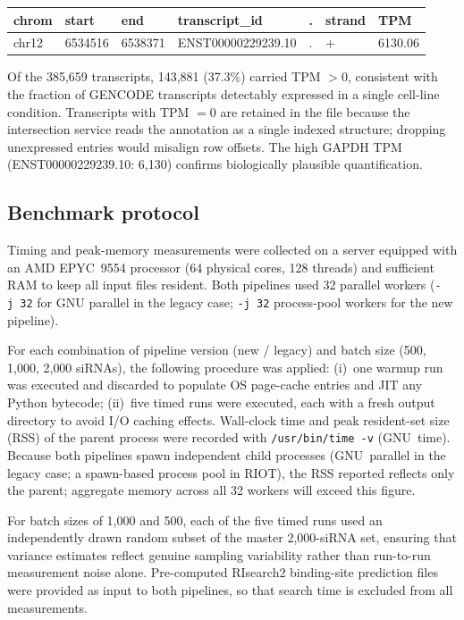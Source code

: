 \begin{center}
\small
\begin{tabular}{lllllll}
\hline
chrom & start & end & transcript\_id & . & strand & TPM \\
\hline
chr12 & 6534516 & 6538371 & ENST00000229239.10 & . & + & 6130.06 \\
\hline
\end{tabular}
\end{center}

Of the 385{,}659 transcripts, 143{,}881 (37.3\%) carried TPM $> 0$, consistent with the fraction of GENCODE transcripts detectably expressed in a single cell-line condition.
Transcripts with TPM $= 0$ are retained in the file because the intersection service reads the annotation as a single indexed structure; dropping unexpressed entries would misalign row offsets.
The high GAPDH TPM (ENST00000229239.10: 6{,}130) confirms biologically plausible quantification.

\subsection*{Benchmark protocol}

Timing and peak-memory measurements were collected on a server equipped with an AMD EPYC~9554 processor (64 physical cores, 128 threads) and sufficient RAM to keep all input files resident.
Both pipelines used 32 parallel workers (\texttt{-j~32} for GNU parallel in the legacy case; \texttt{-j~32} process-pool workers for the new pipeline).

For each combination of pipeline version (new / legacy) and batch size (500, 1{,}000, 2{,}000 siRNAs), the following procedure was applied: (i)~one warmup run was executed and discarded to populate OS page-cache entries and JIT any Python bytecode; (ii)~five timed runs were executed, each with a fresh output directory to avoid I/O caching effects.
Wall-clock time and peak resident-set size (RSS) of the parent process were recorded with \texttt{/usr/bin/time -v} (GNU~time).
Because both pipelines spawn independent child processes (GNU~parallel in the legacy case; a spawn-based process pool in RIOT), the RSS reported reflects only the parent; aggregate memory across all 32 workers will exceed this figure.

For batch sizes of 1{,}000 and 500, each of the five timed runs used an independently drawn random subset of the master 2{,}000-siRNA set, ensuring that variance estimates reflect genuine sampling variability rather than run-to-run measurement noise alone.
Pre-computed RIsearch2 binding-site prediction files were provided as input to both pipelines, so that search time is excluded from all measurements.

